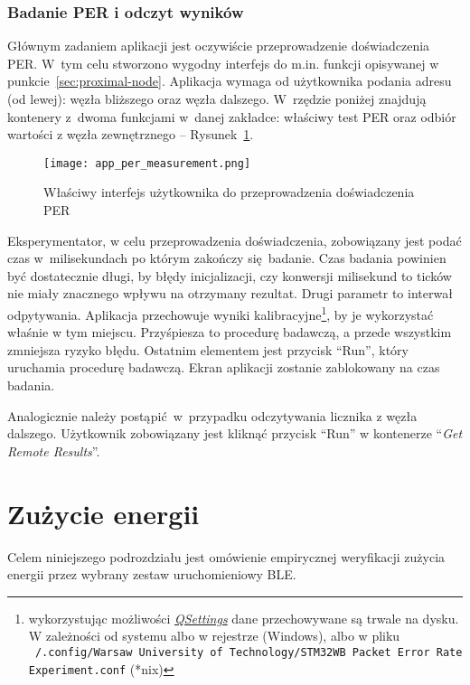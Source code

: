 \subsubsection{Badanie PER i odczyt wyników}
Głównym zadaniem aplikacji jest oczywiście przeprowadzenie doświadczenia PER. W~tym celu
stworzono wygodny interfejs do m.in. funkcji opisywanej w punkcie~\ref{sec:proximal-node}.
Aplikacja wymaga od użytkownika podania adresu (od lewej): węzła bliższego oraz
węzła dalszego. W~rzędzie poniżej znajdują kontenery z~dwoma funkcjami w~danej zakładce:
właściwy test PER oraz odbiór wartości z węzła zewnętrznego -- Rysunek~\ref{app_per_measurement}.
 
\begin{figure}[!ht]
	\centering \texttt{[image: app\_per\_measurement.png]}
	\caption{Właściwy interfejs użytkownika do przeprowadzenia doświadczenia PER}
	\label{app_per_measurement}
\end{figure}

Eksperymentator, w celu przeprowadzenia doświadczenia, zobowiązany jest podać
czas w~milisekundach po którym zakończy się badanie. Czas badania powinien być dostatecznie
długi, by błędy inicjalizacji, czy konwersji milisekund to ticków nie miały znacznego wpływu
na otrzymany rezultat. Drugi parametr to interwał odpytywania. Aplikacja przechowuje
wyniki kalibracyjne\footnote{wykorzystując możliwości \href{https://doc.qt.io/qt-5/qsettings.html}{\textit{QSettings}}
dane przechowywane są trwale na dysku. W zależności od systemu albo w rejestrze (Windows),
albo w pliku \texttt{~/.config/Warsaw University of Technology/STM32WB Packet Error Rate Experiment.conf} (*nix)},
by je wykorzystać właśnie w tym miejscu. Przyśpiesza to procedurę badawczą, a przede wszystkim
zmniejsza ryzyko błędu. Ostatnim elementem jest przycisk \enquote{Run}, który uruchamia procedurę
badawczą. Ekran aplikacji zostanie zablokowany na czas badania.

Analogicznie należy postąpić w~przypadku odczytywania licznika z węzła dalszego. Użytkownik
zobowiązany jest kliknąć przycisk \enquote{Run} w kontenerze \enquote{\textit{Get Remote Results}}.


\section{Zużycie energii}\label{experiment:energy-consumption}
Celem niniejszego podrozdziału jest omówienie empirycznej weryfikacji
zużycia energii przez wybrany zestaw uruchomieniowy \gls{BLE}.

